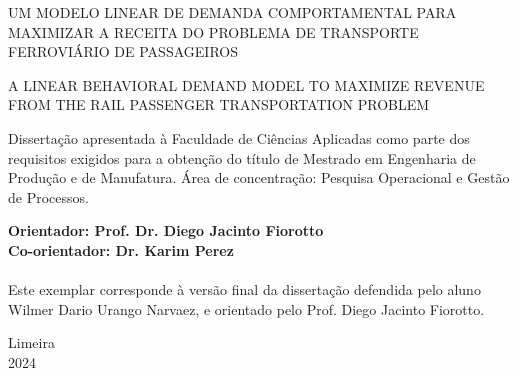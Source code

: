 \vspace*{1.0cm}

\begin{center}
	{\sc \Large UM MODELO LINEAR DE DEMANDA COMPORTAMENTAL PARA MAXIMIZAR A RECEITA DO PROBLEMA DE TRANSPORTE FERROVIÁRIO DE PASSAGEIROS}
	\vspace*{1cm}
\end{center}

\begin{center}
	{\sc \Large A LINEAR BEHAVIORAL DEMAND MODEL TO MAXIMIZE REVENUE FROM THE RAIL PASSENGER TRANSPORTATION PROBLEM}
	\vspace*{1cm}
\end{center}



\begin{flushright}
	\begin{minipage}{9.0cm}
		Dissertação apresentada à Faculdade de Ciências Aplicadas como parte dos
		requisitos exigidos para a obtenção do título de Mestrado em Engenharia de Produção e de Manufatura. Área de
		concentração: Pesquisa Operacional e Gestão de Processos.
	\end{minipage}
\end{flushright}
\vspace*{0.5cm}

\begin{flushleft}
	\begin{minipage}[c]{.5\textwidth}
		\textbf{Orientador: Prof. Dr. Diego Jacinto Fiorotto}\\
		\textbf{Co-orientador: Dr. Karim Perez} \\ \vspace*{1cm} \\
		Este exemplar corresponde à versão final da dissertação defendida pelo aluno Wilmer Dario Urango Narvaez, e orientado pelo Prof. Diego Jacinto Fiorotto.
	\end{minipage}
\end{flushleft}
\vspace*{0.5cm}

\begin{center}
	Limeira\\2024
\end{center}


